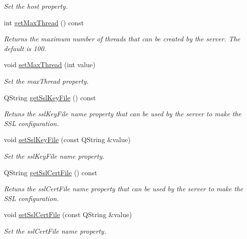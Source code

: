 \begin{DoxyCompactItemize}
\begin{DoxyCompactList}\small\item\em Set the host property. \end{DoxyCompactList}\item 
int \hyperlink{class_c_w_f_1_1_configuration_ac2b487607f5d073bc9e70fc10d6929b9}{get\+Max\+Thread} () const 
\begin{DoxyCompactList}\small\item\em Returns the maximum number of threads that can be created by the server. The default is 100. \end{DoxyCompactList}\item 
void \hyperlink{class_c_w_f_1_1_configuration_afb140b5716c953d403184d47ef97bfba}{set\+Max\+Thread} (int value)
\begin{DoxyCompactList}\small\item\em Set the max\+Thread property. \end{DoxyCompactList}\item 
Q\+String \hyperlink{class_c_w_f_1_1_configuration_aba60d2b15dfff18830d541e460c4640e}{get\+Ssl\+Key\+File} () const 
\begin{DoxyCompactList}\small\item\em Retuns the ssl\+Key\+File name property that can be used by the server to make the S\+S\+L configuration. \end{DoxyCompactList}\item 
void \hyperlink{class_c_w_f_1_1_configuration_a248d424dd8e3f60fc8d8bdeb32a16c9f}{set\+Ssl\+Key\+File} (const Q\+String \&value)
\begin{DoxyCompactList}\small\item\em Set the ssl\+Key\+File name property. \end{DoxyCompactList}\item 
Q\+String \hyperlink{class_c_w_f_1_1_configuration_a42b4b216207c32f46013b23b09358f21}{get\+Ssl\+Cert\+File} () const 
\begin{DoxyCompactList}\small\item\em Retuns the ssl\+Cert\+File name property that can be used by the server to make the S\+S\+L configuration. \end{DoxyCompactList}\item 
void \hyperlink{class_c_w_f_1_1_configuration_a7a531400c3b9797afc2665576d19c69f}{set\+Ssl\+Cert\+File} (const Q\+String \&value)
\begin{DoxyCompactList}\small\item\em Set the ssl\+Cert\+File name property. \end{DoxyCompactList}\item 

\end{DoxyCompactItemize}
